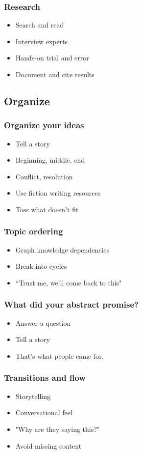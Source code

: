 \documentclass{beamer}
\begin{document}
\begin{frame}[fragile]
\frametitle{Research}
\begin{itemize}[<+(1)->]
\item Search and read
\item Interview experts
\item Hands-on trial and error
\item Document and cite results
\end{itemize}
\end{frame}

\subsection{Organize}
\begin{frame}[fragile]
\frametitle{Organize your ideas}
\begin{itemize}[<+(1)->]
\item Tell a story
\item Beginning, middle, end
\item Conflict, resolution
\item Use fiction writing resources
\item Toss what doesn't fit
\end{itemize}
\end{frame}

\begin{frame}[fragile]
\frametitle{Topic ordering}
\begin{itemize}[<+(1)->]
\item Graph knowledge dependencies
\item Break into cycles
\item ``Trust me, we'll come back to this"
\end{itemize}
\end{frame}

\begin{frame}[fragile]
\frametitle{What did your abstract promise?}
\begin{itemize}[<+(1)->]
\item Answer a question
\item Tell a story
\item That's what people came for.
\end{itemize}
\end{frame}

\begin{frame}[fragile]
\frametitle{Transitions and flow}
\begin{itemize}[<+(1)->]
\item Storytelling
\item Conversational feel
\item "Why are they saying this$?$"
\item Avoid missing content
\end{itemize}
\end{frame}
\end{document}
